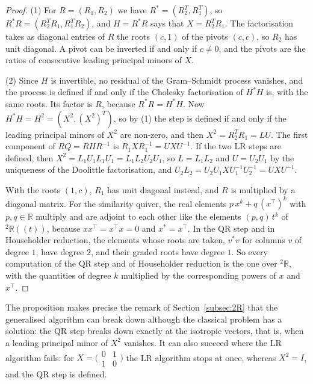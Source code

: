 \documentclass[12pt, a4paper]{report}
\theoremstyle{plain}
\theoremstyle{definition}
\theoremstyle{remark}
\theoremstyle{plain}
\newcommand{\RR}{\mathbb{R}}
\newcommand{\twoR}{{}^{2}\mathbb{R}}
\begin{document}
\begin{proof}
(1) For $R=(R_1,R_2)$ we have $R^*=(R_2^T,R_1^T)$, so $R^*R=(R_2^TR_1,R_1^TR_2)$, and $H=R^*R$ says that $X=R_2^TR_1$. The factorisation takes as diagonal entries of $R$ the roots $(c,1)$ of the pivots $(c,c)$, so $R_2$ has unit diagonal. A pivot can be inverted if and only if $c\neq0$, and the pivots are the ratios of consecutive leading principal minors of $X$.

(2) Since $H$ is invertible, no residual of the Gram--Schmidt process vanishes, and the process is defined if and only if the Cholesky factorisation of $H^*H$ is, with the same roots. Its factor is $R$, because $R^*R=H^*H$. Now $H^*H=H^2=(X^2,(X^2)^T)$, so by (1) the step is defined if and only if the leading principal minors of $X^2$ are non-zero, and then $X^2=R_2^TR_1=LU$. The first component of $RQ=RHR^{-1}$ is $R_1XR_1^{-1}=UXU^{-1}$. If the two LR steps are defined, then $X^2=L_1U_1L_1U_1=L_1L_2U_2U_1$, so $L=L_1L_2$ and $U=U_2U_1$ by the uniqueness of the Doolittle factorisation, and $U_2L_2=U_2U_1XU_1^{-1}U_2^{-1}=UXU^{-1}$.

With the roots $(1,c)$, $R_1$ has unit diagonal instead, and $R$ is multiplied by a diagonal matrix. For the similarity quiver, the real elements $p\,x^k+q\,(x^{\top})^k$ with $p,q\in\RR$ multiply and are adjoint to each other like the elements $(p,q)\,t^k$ of $\twoR((t))$, because $xx^{\top}=x^{\top}x=0$ and $x^*=x^{\top}$. In the QR step and in Householder reduction, the elements whose roots are taken, $v^*v$ for columns $v$ of degree $1$, have degree $2$, and their graded roots have degree $1$. So every computation of the QR step and of Householder reduction is the one over $\twoR$, with the quantities of degree $k$ multiplied by the corresponding powers of $x$ and $x^{\top}$.
\end{proof}

The proposition makes precise the remark of Section~\ref{subsec:2R} that the generalised algorithm can break down although the classical problem has a solution: the QR step breaks down exactly at the isotropic vectors, that is, when a leading principal minor of $X^2$ vanishes. It can also succeed where the LR algorithm fails: for $X=\bigl(\begin{smallmatrix}0&1\\1&0\end{smallmatrix}\bigr)$ the LR algorithm stops at once, whereas $X^2=I$, and the QR step is defined.
\end{document}
